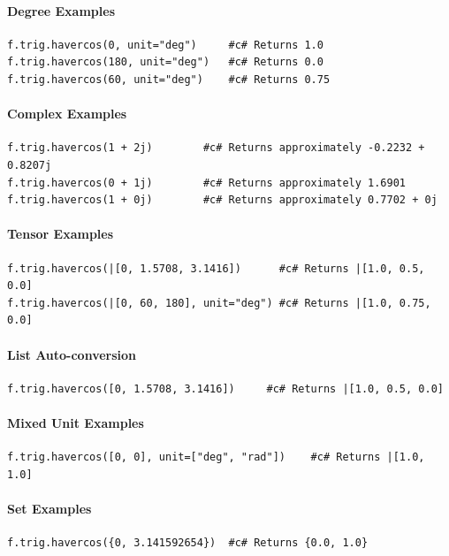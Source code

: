 \paragraph{Degree Examples}
\begin{verbatim}
f.trig.havercos(0, unit="deg")     #c# Returns 1.0
f.trig.havercos(180, unit="deg")   #c# Returns 0.0
f.trig.havercos(60, unit="deg")    #c# Returns 0.75
\end{verbatim}

\paragraph{Complex Examples}
\begin{verbatim}
f.trig.havercos(1 + 2j)        #c# Returns approximately -0.2232 + 0.8207j
f.trig.havercos(0 + 1j)        #c# Returns approximately 1.6901
f.trig.havercos(1 + 0j)        #c# Returns approximately 0.7702 + 0j
\end{verbatim}

\paragraph{Tensor Examples}
\begin{verbatim}
f.trig.havercos(|[0, 1.5708, 3.1416])      #c# Returns |[1.0, 0.5, 0.0]
f.trig.havercos(|[0, 60, 180], unit="deg") #c# Returns |[1.0, 0.75, 0.0]
\end{verbatim}

\paragraph{List Auto-conversion}
\begin{verbatim}
f.trig.havercos([0, 1.5708, 3.1416])     #c# Returns |[1.0, 0.5, 0.0]
\end{verbatim}

\paragraph{Mixed Unit Examples}
\begin{verbatim}
f.trig.havercos([0, 0], unit=["deg", "rad"])    #c# Returns |[1.0, 1.0]
\end{verbatim}

\paragraph{Set Examples}
\begin{verbatim}
f.trig.havercos({0, 3.141592654})  #c# Returns {0.0, 1.0}
\end{verbatim}

